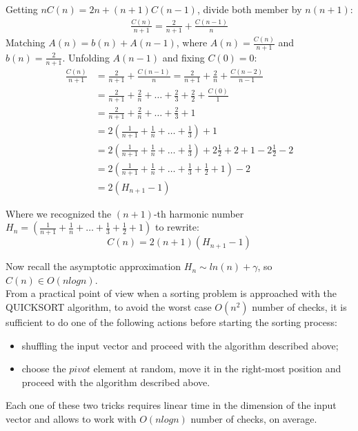 Getting $nC(n) = 2n + (n+1)C(n-1)$, divide both member by $n(n+1)$:
\begin{displaymath}
  \begin{split}
    \frac{C(n)}{n+1}  = \frac{2}{n+1} +
    \frac{C(n-1)}{n}
  \end{split}
\end{displaymath}
Matching $A(n) = b(n) + A(n-1)$, where $A(n) = \frac{C(n)}{n+1} $
and $b(n) = \frac{2}{n+1} $. Unfolding $A(n-1)$ and fixing $C(0) = 0$:
\begin{displaymath}
  \begin{split}
    \frac{C(n)}{n+1} &= \frac{2}{n+1} + \frac{C(n-1)}{n} =
    \frac{2}{n+1} +
    \frac{2}{n} + \frac{C(n-2)}{n-1}\\
    &= \frac{2}{n+1} + \frac{2}{n} + \ldots +
    \frac{2}{3} + \frac{2}{2} + \frac{C(0)}{1}\\
    &= \frac{2}{n+1} + \frac{2}{n} + \ldots +
    \frac{2}{3} + 1\\
    &= 2\left(\frac{1}{n+1} + \frac{1}{n} + \ldots +
      \frac{1}{3}\right) + 1\\
    &= 2\left(\frac{1}{n+1} + \frac{1}{n} + \ldots +
      \frac{1}{3}\right) +2\frac{1}{2} + 2
    + 1 -2\frac{1}{2} - 2\\
    &= 2\left(\frac{1}{n+1} + \frac{1}{n} + \ldots +
      \frac{1}{3}+
      \frac{1}{2}+
      1\right) -2 \\
    &= 2(H_{n+1}-1)
  \end{split}
\end{displaymath}

Where we recognized the $(n+1)$-th harmonic number $H_{n}=\left(\frac{1}{n+1} +
  \frac{1}{n} + \ldots + \frac{1}{3}+ \frac{1}{2}+ 1\right)$
to rewrite: $$C(n) = 2(n+1)(H_{n+1}-1)$$

Now recall the asymptotic approximation $H_n \sim ln(n) + \gamma$,
so $C(n) \in O(nlogn)$.
\\

From a practical point of view when a
sorting problem is approached with the QUICKSORT algorithm, to avoid
the worst case $O(n^2)$ number of checks, it is sufficient to do one
of the following actions before starting the sorting process:
\begin{itemize}
\item shuffling the input vector and proceed with the algorithm
  described above;
\item choose the $pivot$ element at random, move it in the right-most
  position and proceed with the algorithm described above.
\end{itemize}
Each one of these two tricks requires linear time in the dimension of the
input vector and allows to work with $O(nlogn)$ number of checks, on average.

